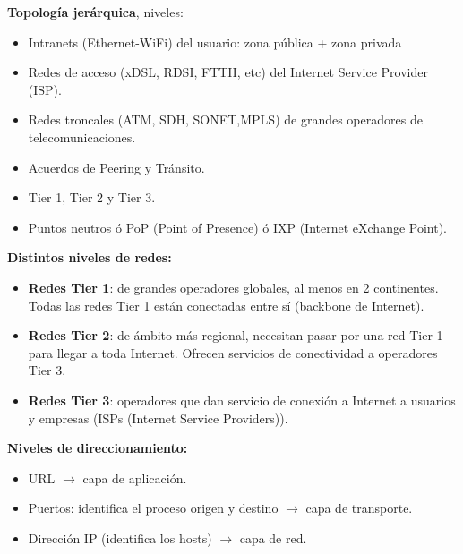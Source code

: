 \documentclass[a4paper,11pt]{article}
\begin{document}
\textbf{Topología jerárquica}, niveles:

\begin{itemize}
\item Intranets (Ethernet-WiFi) del usuario: zona pública + zona privada
\item Redes de acceso (xDSL, RDSI, FTTH, etc) del Internet Service Provider (ISP).
\item Redes troncales (ATM, SDH, SONET,MPLS) de grandes operadores de telecomunicaciones.
\item Acuerdos de Peering y Tránsito.
\item Tier 1, Tier 2 y Tier 3.
\item Puntos neutros ó PoP (Point of Presence) ó IXP (Internet eXchange Point).
\end{itemize}

\textbf{Distintos niveles de redes:}
\begin{itemize}
\item \textbf{Redes Tier 1}: de grandes operadores globales, al menos en 2 continentes. Todas las redes Tier 1 están conectadas entre sí (backbone de Internet).
\item \textbf{Redes Tier 2}: de ámbito más regional, necesitan pasar por una red Tier 1 para llegar a toda Internet. Ofrecen servicios de conectividad a operadores Tier 3.
\item \textbf{Redes Tier 3}: operadores que dan servicio de conexión a Internet a usuarios y empresas (ISPs (Internet Service Providers)).
\end{itemize}

\textbf{Niveles de direccionamiento:}
\begin{itemize}
\item URL $\rightarrow$ capa de aplicación.
\item Puertos: identifica el proceso origen y destino $\rightarrow$ capa de transporte.
\item Dirección IP (identifica los hosts) $\rightarrow$ capa de red.
\end{itemize}
\end{document}
